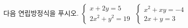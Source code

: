 다음 연립방정식을 푸시오.
 $\begin{cases} x+2y=5 \\ 2x^2+y^2=19 \end{cases}$
 $\begin{cases} x^2+xy=-4 \\ 2x+y=3 \end{cases}$

